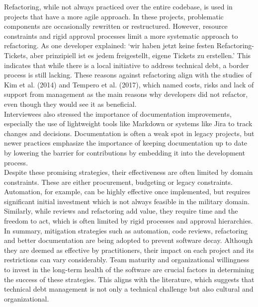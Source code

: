 Refactoring, while not always practiced over the entire codebase, is used in projects that have a more agile approach. In these projects, problematic components are occasionally rewritten or restructured. However, resource constraints and rigid approval processes limit a more systematic approach to refactoring.
As one developer explained: `wir haben jetzt keine festen Refactoring-Tickets, aber prinzipiell ist es jedem freigestellt, eigene Tickets zu erstellen.' This indicates that while there is a local initiative to address technical debt, a border process is still lacking.
These reasons against refactoring align with the studies of Kim et al. (2014) and Tempero et al. (2017), which named costs, risks and lack of support from management as the main reasons why developers did not refactor, even though they would see it as beneficial.\\

Interviewees also stressed the importance of documentation improvements, especially the use of lightweight tools like Markdown or systems like Jira to track changes and decisions. Documentation is often a weak spot in legacy projects, but newer practices 
emphasize the importance of keeping documentation up to date by lowering the barrier for contributions by embedding it into the development process.\\

Despite these promising strategies, their effectiveness are often limited by domain constraints. These are either procurement, budgeting or legacy constraints. Automation, for example, can be highly effective once implemented, but requires significant initial investment which is not always feasible in the military domain.
Similarly, while reviews and refactoring add value, they require time and the freedom to act, which is often limited by rigid processes and approval hierarchies.\\

In summary, mitigation strategies such as automation, code reviews, refactoring and better documentation are being adopted to prevent software decay. Although they are deemed as effective by practitioners, their impact on each project and its restrictions can vary considerably. Team maturity and organizational
willingness to invest in the long-term health of the software are crucial factors in determining the success of these strategies. This aligns with the literature, which suggests that technical debt management is not only a technical challenge but also cultural and organizational.\\

